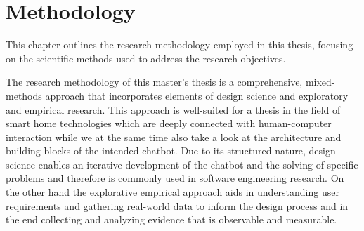 \chapter{Methodology}
\label{chap:method}
This chapter outlines the research methodology employed in this thesis, focusing on the scientific methods used to address the research objectives.

The research methodology of this master's thesis is a comprehensive, mixed-methods approach that incorporates elements of design science and exploratory and empirical research.
This approach is well-suited for a thesis in the field of smart home technologies which are deeply connected with human-computer interaction while we at the same time also take a look at the architecture and building blocks of the intended chatbot.
Due to its structured nature, design science enables an iterative development of the chatbot and the solving of specific problems and therefore is commonly used in software engineering research.
On the other hand the explorative empirical approach aids in understanding user requirements and gathering real-world data to inform the design process and in the end collecting and analyzing evidence that is observable and measurable.

